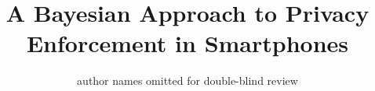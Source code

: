 \documentclass[letterpaper,twocolumn,10pt]{article}
\begin{document}
\date{}


\title{A Bayesian Approach to Privacy Enforcement in Smartphones}
\author{
	{\rm author names omitted for double-blind review}\\
}

\maketitle

















\newpage

\appendix


\end{document}
